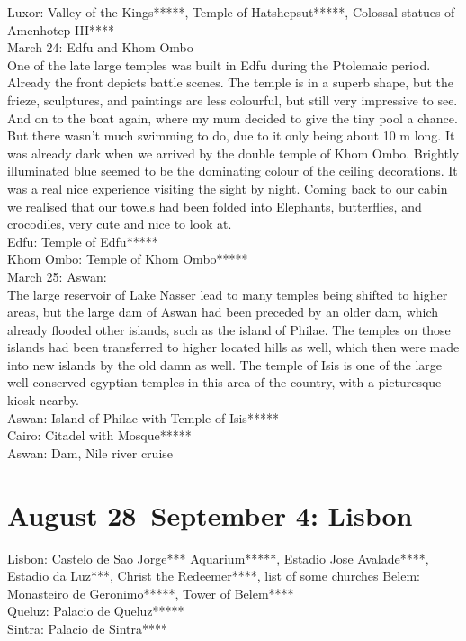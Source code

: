 Luxor: Valley of the Kings*****, Temple of Hatshepsut*****, Colossal statues of Amenhotep III****\\

March 24: Edfu and Khom Ombo\\
One of the late large temples was built in Edfu during the Ptolemaic period. Already the front depicts battle scenes. The temple is in a superb shape, but the frieze, sculptures, and paintings are less colourful, but still very impressive to see. And on to the boat again, where my mum decided to give the tiny pool a chance. But there wasn't much swimming to do, due to it only being about 10 m long. It was already dark when we arrived by
 the double temple of Khom Ombo. Brightly illuminated blue seemed to be the dominating colour of the ceiling decorations. It was a real nice experience visiting the sight by night. Coming back to our cabin we realised that our towels had been folded into Elephants, butterflies, and crocodiles, very cute and nice to look at.\\
 
Edfu: Temple of Edfu*****\\
Khom Ombo: Temple of Khom Ombo*****\\
 
March 25: Aswan:\\
The large reservoir of Lake Nasser lead to many temples being shifted to higher areas, but the large dam of Aswan had been preceded by an older dam, which already flooded other islands, such as the island of Philae. The temples on those islands had been transferred to higher located hills as well, which then were made into new islands by the old damn as well. The temple of Isis is one of the large well conserved egyptian temples in this area of the country, with a picturesque kiosk nearby.\\

Aswan: Island of Philae with Temple of Isis*****\\



Cairo: Citadel with Mosque***** \\
Aswan:  Dam, Nile river cruise

\section{August 28--September 4: Lisbon}
\label{2005:lisbon}



Lisbon: Castelo de Sao Jorge*** Aquarium*****, Estadio Jose Avalade****, Estadio da Luz***, Christ the Redeemer****, list of some churches
Belem: Monasteiro de Geronimo*****, Tower of Belem****\\
Queluz: Palacio de Queluz*****\\
Sintra: Palacio de Sintra****